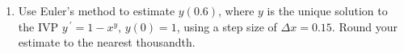 \documentclass{ximera}
\begin{document}
\begin{enumerate}[label=(\arabic*)]
  Hint:  $s^3+a^3=(s+a)(s^2-as+a^2)$.









\item Use Euler's method to estimate $y(0.6)$, where $y$ is the unique solution to the IVP $y\,^{\prime}=1- x^y$, $y(0)=1$, using a step size of $\Delta x=0.15$.  Round your estimate to the nearest thousandth. 









\end{enumerate}
\end{document}
